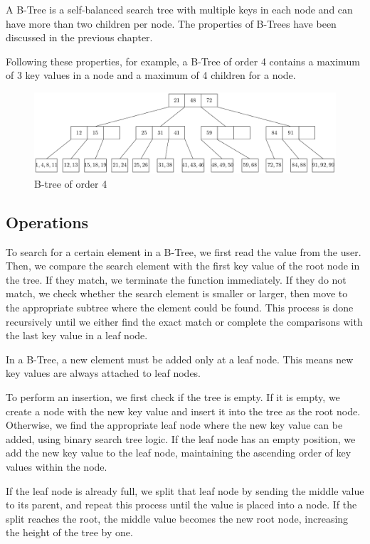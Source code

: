 A B-Tree is a self-balanced search tree with multiple keys in each node and can have more than two children per node. The properties of B-Trees have been discussed in the previous chapter.  

Following these properties, for example, a B-Tree of order 4 contains a maximum of 3 key values in a node and a maximum of 4 children for a node.  
\begin{figure}[H]
  \centering
  \includegraphics[width=\textwidth]{Figure/B-Tree.pdf}
  \caption*{B-tree of order 4}
\end{figure}

\subsection{Operations}
To search for a certain element in a B-Tree, we first read the value from the user. Then, we compare the search element with the first key value of the root node in the tree. If they match, we terminate the function immediately. If they do not match, we check whether the search element is smaller or larger, then move to the appropriate subtree where the element could be found. This process is done recursively until we either find the exact match or complete the comparisons with the last key value in a leaf node.

In a B-Tree, a new element must be added only at a leaf node. This means new key values are always attached to leaf nodes.

To perform an insertion, we first check if the tree is empty. If it is empty, we create a node with the new key value and insert it into the tree as the root node. Otherwise, we find the appropriate leaf node where the new key value can be added, using binary search tree logic. If the leaf node has an empty position, we add the new key value to the leaf node, maintaining the ascending order of key values within the node.

If the leaf node is already full, we split that leaf node by sending the middle value to its parent, and repeat this process until the value is placed into a node. If the split reaches the root, the middle value becomes the new root node, increasing the height of the tree by one.

